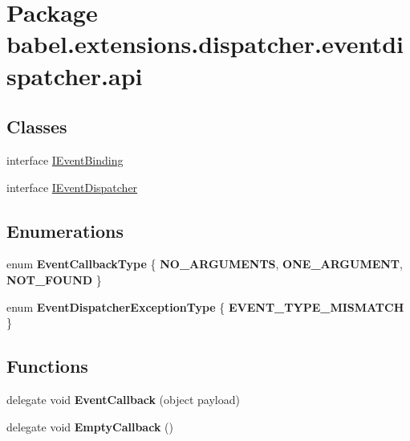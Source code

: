 \hypertarget{namespacebabel_1_1extensions_1_1dispatcher_1_1eventdispatcher_1_1api}{\section{Package babel.\-extensions.\-dispatcher.\-eventdispatcher.\-api}
\label{namespacebabel_1_1extensions_1_1dispatcher_1_1eventdispatcher_1_1api}
}
\subsection*{Classes}
\begin{DoxyCompactItemize}
\item 
interface \hyperlink{interfacebabel_1_1extensions_1_1dispatcher_1_1eventdispatcher_1_1api_1_1_i_event_binding}{I\-Event\-Binding}
\item 
interface \hyperlink{interfacebabel_1_1extensions_1_1dispatcher_1_1eventdispatcher_1_1api_1_1_i_event_dispatcher}{I\-Event\-Dispatcher}
\end{DoxyCompactItemize}
\subsection*{Enumerations}
\begin{DoxyCompactItemize}
\item 
enum {\bfseries Event\-Callback\-Type} \{ {\bfseries N\-O\-\_\-\-A\-R\-G\-U\-M\-E\-N\-T\-S}, 
{\bfseries O\-N\-E\-\_\-\-A\-R\-G\-U\-M\-E\-N\-T}, 
{\bfseries N\-O\-T\-\_\-\-F\-O\-U\-N\-D}
 \}
\item 
enum {\bfseries Event\-Dispatcher\-Exception\-Type} \{ {\bfseries E\-V\-E\-N\-T\-\_\-\-T\-Y\-P\-E\-\_\-\-M\-I\-S\-M\-A\-T\-C\-H}
 \}
\end{DoxyCompactItemize}
\subsection*{Functions}
\begin{DoxyCompactItemize}
\item 
\hypertarget{namespacebabel_1_1extensions_1_1dispatcher_1_1eventdispatcher_1_1api_af52d6785275ae22b7690784c6717f146}{delegate void {\bfseries Event\-Callback} (object payload)}\label{namespacebabel_1_1extensions_1_1dispatcher_1_1eventdispatcher_1_1api_af52d6785275ae22b7690784c6717f146}

\item 
\hypertarget{namespacebabel_1_1extensions_1_1dispatcher_1_1eventdispatcher_1_1api_a8977e8145c959eb98a93f5c397078584}{delegate void {\bfseries Empty\-Callback} ()}\label{namespacebabel_1_1extensions_1_1dispatcher_1_1eventdispatcher_1_1api_a8977e8145c959eb98a93f5c397078584}

\end{DoxyCompactItemize}
